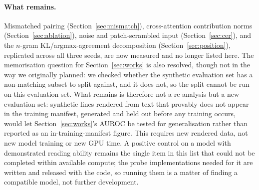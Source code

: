 \documentclass{article}
\begin{document}
\paragraph{What remains.} Mismatched pairing (Section~\ref{sec:mismatch}), cross-attention
contribution norms (Section~\ref{sec:ablation}), noise and patch-scrambled input
(Section~\ref{sec:cer}), and the $n$-gram KL/argmax-agreement decomposition
(Section~\ref{sec:position}), replicated across all three seeds, are now measured and no
longer listed here. The memorisation question for Section~\ref{sec:works} is also resolved,
though not in the way we originally planned: we checked whether the synthetic evaluation set
has a non-matching subset to split against, and it does not, so the split cannot be run on this
evaluation set. What remains is therefore not a re-analysis but a new evaluation set: synthetic
lines rendered from text that provably does not appear in the training manifest, generated and
held out before any training occurs, would let Section~\ref{sec:works}'s AUROC be tested for
generalisation rather than reported as an in-training-manifest figure. This requires new
rendered data, not new model training or new GPU time. A positive control on a model with
demonstrated reading ability remains the single item in this list that could not be completed
within available compute; the probe implementations needed for it are written and released with
the code, so running them is a matter of finding a compatible model, not further development.
\end{document}
